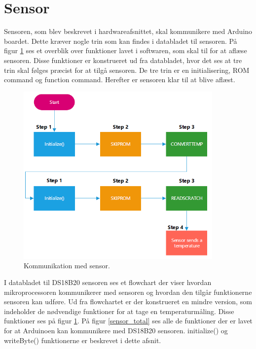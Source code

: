 \newpage
\section{Sensor}
Sensoren, som blev beskrevet i hardwareafsnittet, skal kommunikere med Arduino boardet. Dette kræver nogle trin som kan findes i databladet til sensoren. På figur \ref{sensor_min} ses et overblik over funktioner lavet i softwaren, som skal til for at aflæse sensoren. Disse funktioner er konstrueret ud fra databladet, hvor det ses at tre trin skal følges præcist for at tilgå sensoren. De tre trin er en initialisering, ROM command og function command. Herefter er sensoren klar til at blive aflæst.


\begin{figure}[h!]
  \centering
  \includegraphics[width=0.9\textwidth]{figures/sensor_minimum.png}
  \caption{Kommunikation med sensor.}
  \label{sensor_min}
\end{figure}

I databladet til DS18B20 sensoren ses et flowchart der viser hvordan mikroprocessoren kommunikerer med sensoren og hvordan den tilgår funktionerne  sensoren kan udføre. Ud fra flowchartet er der konstrueret en mindre version, som indeholder de nødvendige funktioner for at tage en temperaturmåling. Disse funktioner ses på figur \ref{sensor_min}.
\newpage
På figur \ref{sensor_total} ses alle de funktioner der er lavet for at Arduinoen kan kommunikere med DS18B20 sensoren. initialize() og writeByte() funktionerne er beskrevet i dette afsnit.

